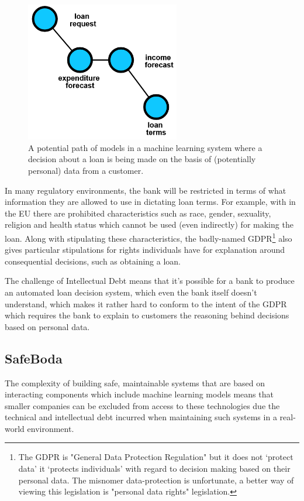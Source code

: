 \documentclass[a4paper]{caesar_book}
\begin{document}
\begin{figure}[htbp]%
	\includegraphics[width=0.6\textwidth,keepaspectratio]{pictures/banking_1.PNG}%
	\caption*{A potential path of models in a machine learning system where a decision about a loan is being made on the basis of (potentially personal) data from a customer.}%
\end{figure}%

In many regulatory environments, the bank will be restricted in terms of what information they are allowed to use in dictating loan terms. For example, with in the EU there are prohibited characteristics such as race, gender, sexuality, religion and health status which cannot be used (even indirectly) for making the loan. Along with stipulating these characteristics, the badly-named GDPR\footnote{The GDPR is "General Data Protection Regulation" but it does not ‘protect data’ it ‘protects individuals’ with regard to decision making based on their personal data. The misnomer data-protection is unfortunate, a better way of viewing this legislation is "personal data rights" legislation.} also gives particular stipulations for rights individuals have for explanation around consequential decisions, such as obtaining a loan.

The challenge of Intellectual Debt means that it’s possible for a bank to produce an automated loan decision system, which even the bank itself doesn’t understand, which makes it rather hard to conform to the intent of the GDPR which requires the bank to explain to customers the reasoning behind decisions based on personal data.

\subsection{SafeBoda}

The complexity of building safe, maintainable systems that are based on interacting components which include machine learning models means that smaller companies can be excluded from access to these technologies due the technical and intellectual debt incurred when maintaining such systems in a real-world environment.
\end{document}
